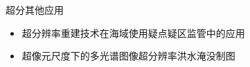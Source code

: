 \begin{frame}{超分其他应用}
    \begin{itemize}
        \item 超分辨率重建技术在海域使用疑点疑区监管中的应用
        \item 超像元尺度下的多光谱图像超分辨率洪水淹没制图
    \end{itemize}
\end{frame}


